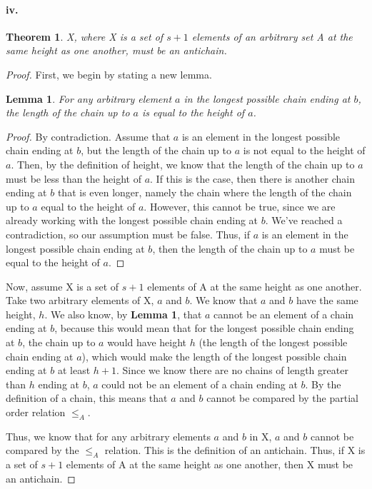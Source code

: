 \documentclass[10pt,letter]{article}
\newtheorem*{thm}{Theorem}
\newtheorem{lem}{Lemma}
\begin{document}
\paragraph{iv.} 
\begin{thm}X, where X is a set of $s+1$ elements of an arbitrary set A at the same height as one another, must be an antichain.\end{thm}
\begin{proof} First, we begin by stating a new lemma.
\begin{lem} For any arbitrary element $a$ in the longest possible chain ending at $b$, the length of the chain up to $a$ is equal to the height of $a$.
\end{lem}
\begin{proof} By contradiction. Assume that $a$ is an element in the longest possible chain ending at $b$, but the length of the chain up to $a$ is not equal to the height of $a$. Then, by the definition of height, we know that the length of the chain up to $a$ must be less than the height of $a$. If this is the case, then there is another chain ending at $b$ that is even longer, namely the chain where the length of the chain up to $a$ equal to the height of $a$. However, this cannot be true, since we are already working with the longest possible chain ending at $b$. We've reached a contradiction, so our assumption must be false. Thus, if $a$ is an element in the longest possible chain ending at $b$, then the length of the chain up to $a$ must be equal to the height of $a$.
\end{proof}

Now, assume X is a set of $s+1$ elements of A at the same height as one another. Take two arbitrary elements of X, $a$ and $b$. We know that $a$ and $b$ have the same height, $h$. We also know, by \textbf{Lemma 1}, that $a$ cannot be an element of a chain ending at $b$, because this would mean that for the longest possible chain ending at $b$, the chain up to $a$ would have height $h$ (the length of the longest possible chain ending at $a$), which would make the length of the longest possible chain ending at $b$ at least $h+1$. Since we know there are no chains of length greater than $h$ ending at $b$, $a$ could not be an element of a chain ending at $b$. By the definition of a chain, this means that $a$ and $b$ cannot be compared by the partial order relation $\leq_A$.

Thus, we know that for any arbitrary elements $a$ and $b$ in X, $a$ and $b$ cannot be compared by the $\leq_A$ relation. This is the definition of an antichain. Thus, if X is a set of $s+1$ elements of  A at the same height as one another, then X must be an antichain.
\end{proof}
\end{document}
